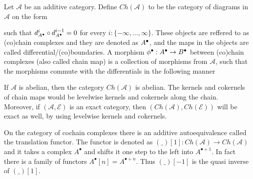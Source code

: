     \begin{definition}
        Let $\mathcal{A}$ be an additive category. Define $Ch(\mathcal{A})$ to be the category of diagrams in $\mathcal{A}$ on the form
        \begin{center}
        \end{center}
        such that $d^i_{A^{\bullet}}\circ d^{i-1}_{A^{\bullet}}=0$ for every $i:\{-\infty,...,\infty\}$. These objects are reffered to as (co)chain complexes and they are denoted as $A^{\bullet}$, and the maps in the objects are called differential/(co)boundaries. A morphism $\phi^{\bullet} : A^{\bullet}\rightarrow B^{\bullet}$ between (co)chain complexes (also called chain map) is a collection of morphisms from $\mathcal{A}$, such that the morphisms commute with the differentials in the following manner
        \begin{center}
        \end{center}
    \end{definition}

    \begin{remark}
        If $\mathcal{A}$ is abelian, then the category $Ch(\mathcal{A})$ is abelian. The kernels and cokernels of chain maps would be levelwise kernels and cokernels along the chain. Moreover, if $(\mathcal{A},\mathcal{E})$ is an exact category, then $(Ch(\mathcal{A}),Ch(\mathcal{E}))$ will be exact as well, by using levelwise kernels and cokernels.
    \end{remark}

    \begin{remark}
        On the category of cochain complexes there is an additive autoequivalence called the translation functor. The functor is denoted as $(\_)[1]:Ch(\mathcal{A})\rightarrow Ch(\mathcal{A})$ and it takes a complex $A^{\bullet}$ and shifts it one step to the left into $A^{\bullet + 1}$. In fact there is a family of functors $A^{\bullet}[n]=A^{\bullet + n}$. Thus $(\_)[-1]$ is the quasi inverse of $(\_)[1]$.
    \end{remark}

